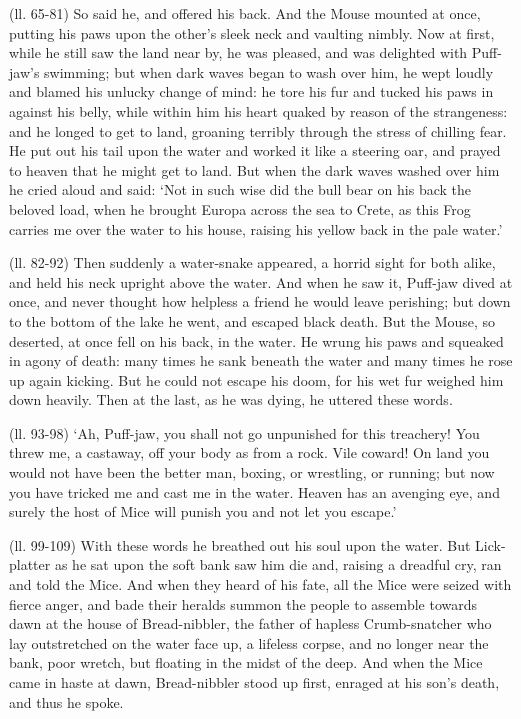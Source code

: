 (ll. 65-81) So said he, and offered his back. And the Mouse mounted at once,
putting his paws upon the other’s sleek neck and vaulting nimbly. Now at
first, while he still saw the land near by, he was pleased, and was delighted
with Puff-jaw’s swimming; but when dark waves began to wash over him, he
wept loudly and blamed his unlucky change of mind: he tore his fur and tucked
his paws in against his belly, while within him his heart quaked by reason of
the strangeness: and he longed to get to land, groaning terribly through the
stress of chilling fear. He put out his tail upon the water and worked it like
a steering oar, and prayed to heaven that he might get to land. But when the
dark waves washed over him he cried aloud and said: ‘Not in such wise did
the bull bear on his back the beloved load, when he brought Europa across the
sea to Crete, as this Frog carries me over the water to his house, raising his
yellow back in the pale water.’

(ll. 82-92) Then suddenly a water-snake appeared, a horrid sight for both
alike, and held his neck upright above the water. And when he saw it, Puff-jaw
dived at once, and never thought how helpless a friend he would leave
perishing; but down to the bottom of the lake he went, and escaped black death.
But the Mouse, so deserted, at once fell on his back, in the water. He wrung
his paws and squeaked in agony of death: many times he sank beneath the water
and many times he rose up again kicking. But he could not escape his doom, for
his wet fur weighed him down heavily. Then at the last, as he was dying, he
uttered these words.

(ll. 93-98) ‘Ah, Puff-jaw, you shall not go unpunished for this
treachery! You threw me, a castaway, off your body as from a rock. Vile coward!
On land you would not have been the better man, boxing, or wrestling, or
running; but now you have tricked me and cast me in the water. Heaven has an
avenging eye, and surely the host of Mice will punish you and not let you
escape.’

(ll. 99-109) With these words he breathed out his soul upon the water. But
Lick-platter as he sat upon the soft bank saw him die and, raising a dreadful
cry, ran and told the Mice. And when they heard of his fate, all the Mice were
seized with fierce anger, and bade their heralds summon the people to assemble
towards dawn at the house of Bread-nibbler, the father of hapless
Crumb-snatcher who lay outstretched on the water face up, a lifeless corpse,
and no longer near the bank, poor wretch, but floating in the midst of the
deep. And when the Mice came in haste at dawn, Bread-nibbler stood up first,
enraged at his son’s death, and thus he spoke.

